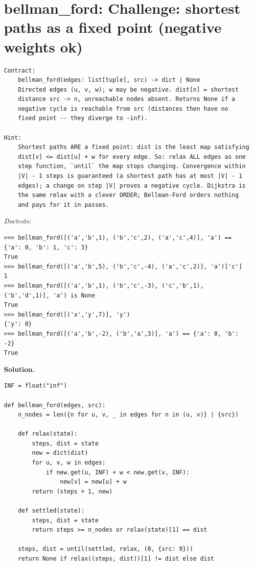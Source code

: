 \documentclass[11pt,letterpaper]{book}
\begin{document}
\section{bellman\_ford: Challenge: shortest paths as a fixed point (negative weights ok)}
\begin{lstlisting}[style=spec]
Contract:
    bellman_ford(edges: list[tuple], src) -> dict | None
    Directed edges (u, v, w); w may be negative. dist[n] = shortest
    distance src -> n, unreachable nodes absent. Returns None if a
    negative cycle is reachable from src (distances then have no
    fixed point -- they diverge to -inf).

Hint:
    Shortest paths ARE a fixed point: dist is the least map satisfying
    dist[v] <= dist[u] + w for every edge. So: relax ALL edges as one
    step function, `until` the map stops changing. Convergence within
    |V| - 1 steps is guaranteed (a shortest path has at most |V| - 1
    edges); a change on step |V| proves a negative cycle. Dijkstra is
    the same relax with a clever ORDER; Bellman-Ford orders nothing
    and pays for it in passes.
\end{lstlisting}
\noindent\textit{Doctests:}
\begin{lstlisting}[style=spec]
>>> bellman_ford([('a','b',1), ('b','c',2), ('a','c',4)], 'a') == {'a': 0, 'b': 1, 'c': 3}
True
>>> bellman_ford([('a','b',5), ('b','c',-4), ('a','c',2)], 'a')['c']
1
>>> bellman_ford([('a','b',1), ('b','c',-3), ('c','b',1), ('b','d',1)], 'a') is None
True
>>> bellman_ford([('x','y',7)], 'y')
{'y': 0}
>>> bellman_ford([('a','b',-2), ('b','a',3)], 'a') == {'a': 0, 'b': -2}
True
\end{lstlisting}
\noindent\textbf{Solution.}
\begin{lstlisting}[style=code]
INF = float("inf")

def bellman_ford(edges, src):
    n_nodes = len({n for u, v, _ in edges for n in (u, v)} | {src})

    def relax(state):
        steps, dist = state
        new = dict(dist)
        for u, v, w in edges:
            if new.get(u, INF) + w < new.get(v, INF):
                new[v] = new[u] + w
        return (steps + 1, new)

    def settled(state):
        steps, dist = state
        return steps >= n_nodes or relax(state)[1] == dist

    steps, dist = until(settled, relax, (0, {src: 0}))
    return None if relax((steps, dist))[1] != dist else dist
\end{lstlisting}
\end{document}

